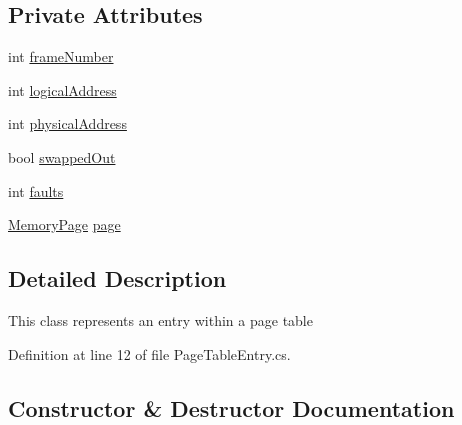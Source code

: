 \subsection*{Private Attributes}
\begin{DoxyCompactItemize}
\item 
int \hyperlink{class_c_p_u___o_s___simulator_1_1_memory_1_1_page_table_entry_ab3e63e9a522928053429134a5da1be6f}{frame\+Number}
\item 
int \hyperlink{class_c_p_u___o_s___simulator_1_1_memory_1_1_page_table_entry_a8450b36db4a744e50336172e5d4b46b2}{logical\+Address}
\item 
int \hyperlink{class_c_p_u___o_s___simulator_1_1_memory_1_1_page_table_entry_a71d2929d34816c5f6a52a66e08ef879c}{physical\+Address}
\item 
bool \hyperlink{class_c_p_u___o_s___simulator_1_1_memory_1_1_page_table_entry_ab31d6265aff999ff7a94481f1efc45b5}{swapped\+Out}
\item 
int \hyperlink{class_c_p_u___o_s___simulator_1_1_memory_1_1_page_table_entry_a7aefba3f2cb43ba3d9cb37e659d90d44}{faults}
\item 
\hyperlink{class_c_p_u___o_s___simulator_1_1_memory_1_1_memory_page}{Memory\+Page} \hyperlink{class_c_p_u___o_s___simulator_1_1_memory_1_1_page_table_entry_a6b89a8e8d1cbbd3b52a7af37ba8669a7}{page}
\end{DoxyCompactItemize}


\subsection{Detailed Description}
This class represents an entry within a page table 



Definition at line 12 of file Page\+Table\+Entry.\+cs.



\subsection{Constructor \& Destructor Documentation}
\hypertarget{class_c_p_u___o_s___simulator_1_1_memory_1_1_page_table_entry_a5c70feafd00522bc15c8b5461ae22622}{}
